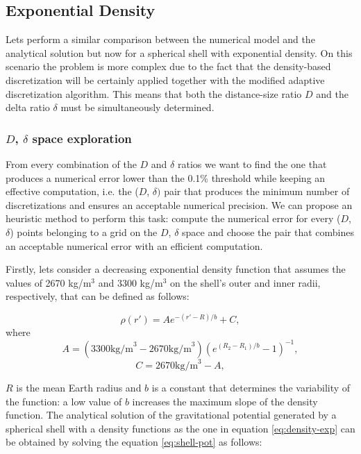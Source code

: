 \documentclass[extra]{gji}
\begin{document}
\subsection{Exponential Density}

Lets perform a similar comparison between the numerical model and 
the analytical solution but now for a spherical shell with exponential 
density.
On this scenario the problem is more complex due to the fact that the 
density-based discretization will be certainly applied together with 
the modified adaptive discretization algorithm.
This means that both the distance-size ratio $D$ and the delta ratio 
$\delta$ must be simultaneously determined.

\subsubsection{$D$, $\delta$ space exploration}

From every combination of the $D$ and $\delta$ ratios we want to find 
the one that produces a numerical error lower than the 0.1\% threshold 
while keeping an effective computation, i.e. the ($D$, $\delta)$ pair 
that produces the minimum number of discretizations and ensures an 
acceptable numerical precision.
We can propose an heuristic method to perform this task: compute the 
numerical error for every ($D$, $\delta$) points belonging to a grid on 
the $D$, $\delta$ space and choose the pair that combines an 
acceptable numerical error with an efficient computation.

Firstly, lets consider a decreasing exponential density function that 
assumes the values of 2670 kg/m$^3$ and 3300 kg/m$^3$ on the shell's 
outer and inner radii, respectively, that can be defined as follows:

\begin{equation}
    \rho(r') = A e^{-(r' - R)/b} + C,
\label{eq:density-exp}
\end{equation}
\noindent where
\begin{equation}
    A =
    (3300 \text{kg/m}^3 - 2670 \text{kg/m}^3)
    \left( e^{( R_2 - R_1 )/b} - 1 \right)^{-1},
\end{equation}
\begin{equation}
    C =
    2670 \text{kg/m}^3 - A,
\end{equation}

\noindent $R$ is the mean Earth radius and $b$ is a constant 
that determines the variability of the function: a low value of $b$ 
increases the maximum slope of the density function.
The analytical solution of the gravitational potential generated by a 
spherical shell with a density functions as the one in equation 
\ref{eq:density-exp} can be obtained by solving the equation 
\ref{eq:shell-pot} as follows:
\end{document}
